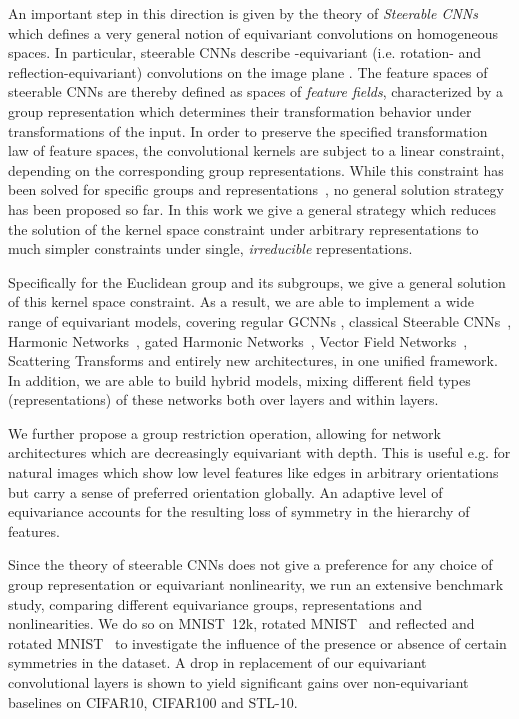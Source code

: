 \documentclass{article}
\begin{document}
An important step in this direction is given by the theory of \emph{Steerable CNNs}~\cite{Cohen2017-STEER,3d_steerableCNNs,Cohen2018-IIR,generaltheory,gauge} which defines a very general notion of equivariant convolutions on homogeneous spaces.
In particular, steerable CNNs describe -equivariant (i.e. rotation- and reflection-equivariant) convolutions on the image plane .
The feature spaces of steerable CNNs are thereby defined as spaces of \emph{feature fields}, characterized by a group representation which determines their transformation behavior under transformations of the input.
In order to preserve the specified transformation law of feature spaces, the convolutional kernels are subject to a linear constraint, depending on the corresponding group representations.
While this constraint has been solved for specific groups and representations~\cite{Cohen2017-STEER,3d_steerableCNNs}, no general solution strategy has been proposed so far.
In this work we give a general strategy which reduces the solution of the kernel space constraint under arbitrary representations to much simpler constraints under single, \emph{irreducible} representations.

Specifically for the Euclidean group  and its subgroups, we give a general solution of this kernel space constraint.
As a result, we are able to implement a wide range of equivariant models, covering regular GCNNs
\cite{Cohen2016-GCNN,Weiler2018-STEERABLE,Hoogeboom2018-HEX,bekkers2018roto,Dieleman2016-CYC,Kondor2018-GENERAL},
classical Steerable CNNs~\cite{Cohen2017-STEER}, Harmonic Networks~\cite{Worrall2017-HNET}, gated Harmonic Networks~\cite{3d_steerableCNNs}, Vector Field Networks~\cite{Marcos2017-VFN},
Scattering Transforms \cite{sifre2012combined,Sifre2013-GSCAT,bruna2013invariant,sifre2014rigid,oyallonDeepRotoTranslationScattering2015}
and entirely new architectures, in one unified framework.
In addition, we are able to build hybrid models, mixing different field types (representations) of these networks both over layers and within layers.


We further propose a group restriction operation, allowing for network architectures which are decreasingly equivariant with depth.
This is useful e.g. for natural images which show low level features like edges in arbitrary orientations but carry a sense of preferred orientation globally.
An adaptive level of equivariance accounts for the resulting loss of symmetry in the hierarchy of features.

Since the theory of steerable CNNs does not give a preference for any choice of group representation or equivariant nonlinearity, we run an extensive benchmark study, comparing different equivariance groups, representations and nonlinearities.
We do so on MNIST~12k, rotated MNIST~ and reflected and rotated MNIST~ to investigate the influence of the presence or absence of certain symmetries in the dataset.
A drop in replacement of our equivariant convolutional layers is shown to yield significant gains over non-equivariant baselines on CIFAR10, CIFAR100 and STL-10.
\end{document}
